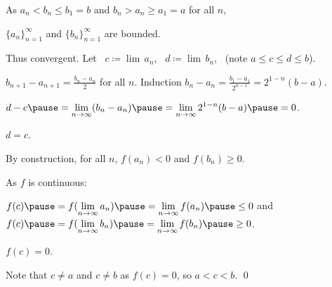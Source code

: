 \documentclass[10pt,aspectratio=169]{beamer}
\begin{document}
\begin{frame}
As $a_n < b_n \leq b_1 = b$ and 
$b_n > a_n \geq a_1 = a$ for all $n$,

\pause
$\{a_n\}_{n=1}^\infty$ and $\{ b_n \}_{n=1}^\infty$ are bounded.

\pause
\medskip

Thus convergent. Let ~$c \coloneqq \lim\, a_n$,~ $d \coloneqq \lim\, b_n$,
~(note $a \leq c \leq d \leq b$).

\pause
\medskip

$b_{n+1} - a_{n+1} = \frac{b_n-a_n}{2}$ for all $n$.
\pause
\qquad 
Induction \wthus
$b_n - a_n
= \frac{b_1-a_1}{2^{n-1}}
= 2^{1-n} (b-a)$.

\pause
\medskip

$\displaystyle
d-c
\pause
= \lim_{n\to\infty} (b_n - a_n)
\pause
=
\lim_{n\to\infty} 2^{1-n} (b-a)
\pause
= 0$.

\pause
\medskip

\thus \quad $d=c$.

\pause
\medskip

By construction, for all $n$, \quad
$f(a_n) < 0$ \quad and \quad $f(b_n) \geq 0$.

\pause
\medskip

As $f$ is continuous:

\medskip

$f(c)
\pause
=
f(\lim\limits_{n\to\infty} a_n)
\pause
=
\lim\limits_{n\to\infty} f(a_n)
\pause
\leq 0$
\pause
\qquad and \qquad
$f(c)
\pause
=
f(\lim\limits_{n\to\infty} b_n)
\pause
=
\lim\limits_{n\to\infty} f(b_n)
\pause
\geq 0$.

\pause
\medskip

\thus \quad $f(c) = 0$.

\pause
\medskip

Note that $c \not=a$ and $c \not= b$ as $f(c)=0$, \quad so $a < c < b$.  \qed
\end{frame}
\end{document}
